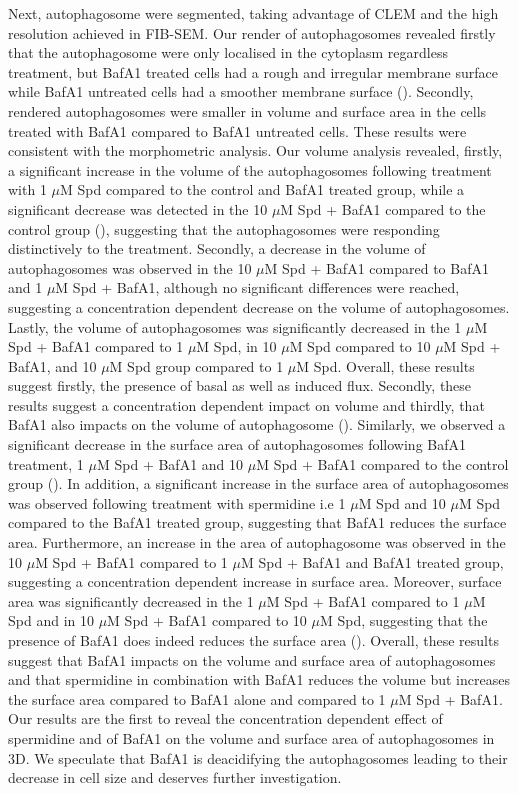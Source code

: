 Next, autophagosome were segmented, taking advantage of CLEM and the high resolution achieved in FIB-SEM. Our render of autophagosomes revealed firstly that the autophagosome were only localised in the cytoplasm regardless treatment, but BafA1 treated cells had a rough and irregular membrane surface while BafA1 untreated cells had a smoother membrane surface (). Secondly, rendered autophagosomes were smaller in volume and surface area in the cells treated with BafA1 compared to BafA1 untreated cells. These results were consistent with the morphometric analysis. Our volume analysis revealed, firstly, a significant increase in the volume of the autophagosomes following treatment with 1 $\mu$M Spd compared to the control and BafA1 treated group, while a significant decrease was detected in the 10 $\mu$M Spd + BafA1 compared to the control group (), suggesting that the autophagosomes were responding distinctively to the treatment.  Secondly, a decrease in the volume of autophagosomes was observed in the 10 $\mu$M Spd + BafA1 compared to BafA1 and 1 $\mu$M Spd + BafA1, although no significant differences were reached, suggesting a concentration  dependent decrease on the volume of autophagosomes. Lastly, the volume of autophagosomes was significantly decreased in the 1 $\mu$M Spd + BafA1 compared to 1 $\mu$M Spd, in 10 $\mu$M Spd  compared to 10 $\mu$M Spd + BafA1, and 10 $\mu$M Spd group compared to 1 $\mu$M Spd. Overall, these results suggest firstly, the presence of basal as well as induced flux. Secondly, these results suggest a concentration dependent impact on volume and thirdly, that BafA1 also impacts on the volume of autophagosome (). Similarly, we observed a significant decrease in the surface area of autophagosomes following  BafA1 treatment, 1 $\mu$M Spd + BafA1  and 10 $\mu$M Spd + BafA1 compared to the control group (). In addition, a significant increase in the surface area of autophagosomes was observed following treatment with spermidine i.e 1 $\mu$M Spd  and 10 $\mu$M Spd compared to the BafA1 treated group, suggesting that BafA1 reduces the surface area. Furthermore, an increase in the area of autophagosome was observed in the 10 $\mu$M Spd + BafA1 compared to 1 $\mu$M Spd + BafA1 and BafA1 treated group, suggesting a concentration dependent increase in surface area. Moreover, surface area was significantly decreased in the 1 $\mu$M Spd + BafA1 compared to 1 $\mu$M Spd and in 10 $\mu$M Spd + BafA1 compared to 10 $\mu$M Spd, suggesting that the presence of BafA1 does indeed reduces the surface area (). Overall, these results suggest that BafA1 impacts on the volume and surface area of autophagosomes and that spermidine in combination with BafA1 reduces the volume but increases the surface area compared to BafA1 alone and compared to 1 $\mu$M Spd + BafA1. Our results are the first to reveal the concentration dependent effect of spermidine and of BafA1 on the volume and surface area of autophagosomes in 3D. We speculate that BafA1 is deacidifying the autophagosomes leading to their decrease in cell size and deserves further investigation.
